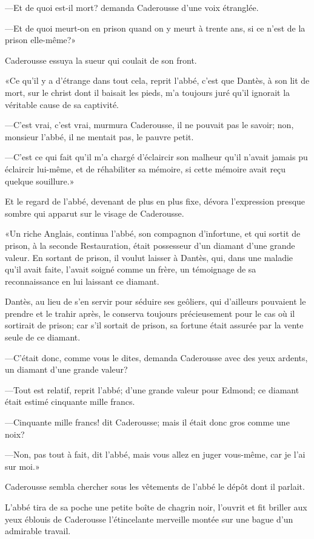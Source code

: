 —Et de quoi est-il mort? demanda Caderousse d'une voix étranglée.

—Et de quoi meurt-on en prison quand on y meurt à trente ans, si ce n'est de la prison elle-même?»

Caderousse essuya la sueur qui coulait de son front.

«Ce qu'il y a d'étrange dans tout cela, reprit l'abbé, c'est que Dantès, à son lit de mort, sur le christ dont il baisait les pieds, m'a toujours juré qu'il ignorait la véritable cause de sa captivité.

—C'est vrai, c'est vrai, murmura Caderousse, il ne pouvait pas le savoir; non, monsieur l'abbé, il ne mentait pas, le pauvre petit.

—C'est ce qui fait qu'il m'a chargé d'éclaircir son malheur qu'il n'avait jamais pu éclaircir lui-même, et de réhabiliter sa mémoire, si cette mémoire avait reçu quelque souillure.»

Et le regard de l'abbé, devenant de plus en plus fixe, dévora l'expression presque sombre qui apparut sur le visage de Caderousse.

«Un riche Anglais, continua l'abbé, son compagnon d'infortune, et qui sortit de prison, à la seconde Restauration, était possesseur d'un diamant d'une grande valeur. En sortant de prison, il voulut laisser à Dantès, qui, dans une maladie qu'il avait faite, l'avait soigné comme un frère, un témoignage de sa reconnaissance en lui laissant ce diamant.

Dantès, au lieu de s'en servir pour séduire ses geôliers, qui d'ailleurs pouvaient le prendre et le trahir après, le conserva toujours précieusement pour le cas où il sortirait de prison; car s'il sortait de prison, sa fortune était assurée par la vente seule de ce diamant.

—C'était donc, comme vous le dites, demanda Caderousse avec des yeux ardents, un diamant d'une grande valeur?

—Tout est relatif, reprit l'abbé; d'une grande valeur pour Edmond; ce diamant était estimé cinquante mille francs.

—Cinquante mille francs! dit Caderousse; mais il était donc gros comme une noix?

—Non, pas tout à fait, dit l'abbé, mais vous allez en juger vous-même, car je l'ai sur moi.»

Caderousse sembla chercher sous les vêtements de l'abbé le dépôt dont il parlait.

L'abbé tira de sa poche une petite boîte de chagrin noir, l'ouvrit et fit briller aux yeux éblouis de Caderousse l'étincelante merveille montée sur une bague d'un admirable travail.

